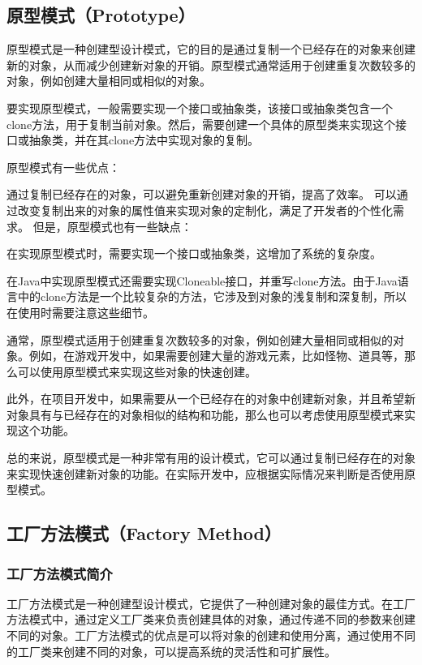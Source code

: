 \documentclass[cn,black,12pt,normal]{elegantnote}
\begin{document}
\subsection{原型模式（Prototype）}

原型模式是一种创建型设计模式，它的目的是通过复制一个已经存在的对象来创建新的对象，从而减少创建新对象的开销。原型模式通常适用于创建重复次数较多的对象，例如创建大量相同或相似的对象。

要实现原型模式，一般需要实现一个接口或抽象类，该接口或抽象类包含一个clone方法，用于复制当前对象。然后，需要创建一个具体的原型类来实现这个接口或抽象类，并在其clone方法中实现对象的复制。

原型模式有一些优点：

通过复制已经存在的对象，可以避免重新创建对象的开销，提高了效率。
可以通过改变复制出来的对象的属性值来实现对象的定制化，满足了开发者的个性化需求。
但是，原型模式也有一些缺点：

在实现原型模式时，需要实现一个接口或抽象类，这增加了系统的复杂度。

在Java中实现原型模式还需要实现Cloneable接口，并重写clone方法。由于Java语言中的clone方法是一个比较复杂的方法，它涉及到对象的浅复制和深复制，所以在使用时需要注意这些细节。

通常，原型模式适用于创建重复次数较多的对象，例如创建大量相同或相似的对象。例如，在游戏开发中，如果需要创建大量的游戏元素，比如怪物、道具等，那么可以使用原型模式来实现这些对象的快速创建。

此外，在项目开发中，如果需要从一个已经存在的对象中创建新对象，并且希望新对象具有与已经存在的对象相似的结构和功能，那么也可以考虑使用原型模式来实现这个功能。

总的来说，原型模式是一种非常有用的设计模式，它可以通过复制已经存在的对象来实现快速创建新对象的功能。在实际开发中，应根据实际情况来判断是否使用原型模式。


\subsection{工厂方法模式（Factory Method）}

\subsubsection{工厂方法模式简介}

工厂方法模式是一种创建型设计模式，它提供了一种创建对象的最佳方式。在工厂方法模式中，通过定义工厂类来负责创建具体的对象，通过传递不同的参数来创建不同的对象。工厂方法模式的优点是可以将对象的创建和使用分离，通过使用不同的工厂类来创建不同的对象，可以提高系统的灵活性和可扩展性。
\end{document}
